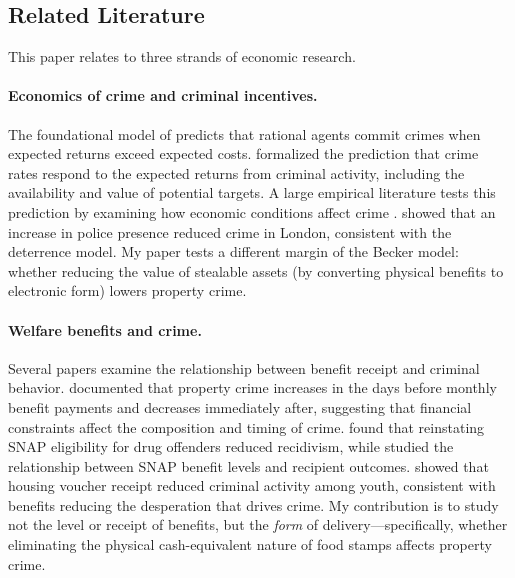 \documentclass[12pt]{article}
\begin{document}
\subsection{Related Literature}

This paper relates to three strands of economic research.

\paragraph{Economics of crime and criminal incentives.} The foundational model of \citet{becker1968crime} predicts that rational agents commit crimes when expected returns exceed expected costs. \citet{ehrlich1973participation} formalized the prediction that crime rates respond to the expected returns from criminal activity, including the availability and value of potential targets. A large empirical literature tests this prediction by examining how economic conditions affect crime \citep{levitt1996effect, donohue2001impact, chalfin2022criminal}. \citet{draca2011panic} showed that an increase in police presence reduced crime in London, consistent with the deterrence model. My paper tests a different margin of the Becker model: whether reducing the value of stealable assets (by converting physical benefits to electronic form) lowers property crime.

\paragraph{Welfare benefits and crime.} Several papers examine the relationship between benefit receipt and criminal behavior. \citet{foley2011effect} documented that property crime increases in the days before monthly benefit payments and decreases immediately after, suggesting that financial constraints affect the composition and timing of crime. \citet{tuttle2019snapping} found that reinstating SNAP eligibility for drug offenders reduced recidivism, while \citet{carr2019snap} studied the relationship between SNAP benefit levels and recipient outcomes. \citet{jacob2012effect} showed that housing voucher receipt reduced criminal activity among youth, consistent with benefits reducing the desperation that drives crime. My contribution is to study not the level or receipt of benefits, but the \textit{form} of delivery---specifically, whether eliminating the physical cash-equivalent nature of food stamps affects property crime.
\end{document}
